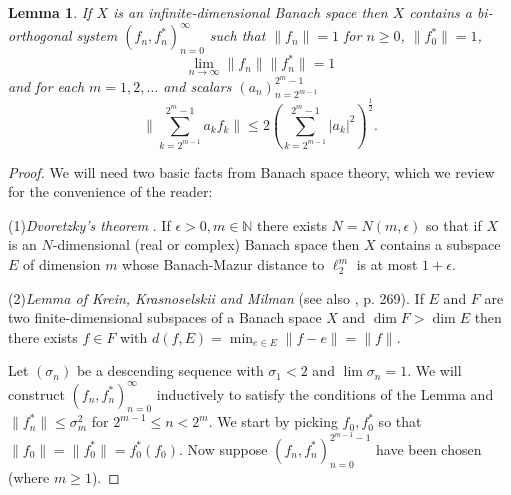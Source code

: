 \documentclass[12pt]{amsart}
\newtheorem{lemma}[thm]{Lemma}
\begin{document}
\begin{lemma}\label{arbitrary}  If $X$ is an infinite-dimensional
Banach space then $X$ contains a bi-orthogonal system
$(f_n,f_n^*)_{n=0}^{\infty}$ such that $\|f_n\|=1$ for $n\ge 0$,
$\|f_0^*\|=1$,
$$ \lim_{n\to\infty}\|f_n\|\|f_n^*\|=1$$ and for each
$m=1,2,\ldots$ and scalars $(a_n)_{n=2^{m-1}}^{2^m-1}$
$$\|\sum_{k=2^{m-1}}^{2^m-1}a_kf_k\|\le
2\left(\sum_{k=2^{m-1}}^{2^m-1}|a_k|^2\right)^{\frac12}.$$
\end{lemma}

\begin{proof}
We will need two basic facts from Banach space theory, which we
review for the convenience of the reader:

(1){\it Dvoretzky's theorem } \cite{MS}.  If $\epsilon>0,
m\in\mathbb N$ there exists $N=N(m,\epsilon)$ so that if $X$ is an
$N$-dimensional (real or complex) Banach space then $X$ contains a
subspace $E$ of dimension $m$ whose Banach-Mazur distance to
$\ell_2^m$ is at most $1+\epsilon.$

(2){\it Lemma of Krein, Krasnoselskii and Milman} \cite{KKR} (see
also \cite{S}, p. 269).  If $E$ and $F$ are two finite-dimensional
subspaces of a Banach space $X$ and $\dim F>\dim E$ then there
exists $f\in F$ with $d(f,E)=\min_{e\in E}\|f-e\|=\|f\|.$



 Let $(\sigma_n)$ be a descending sequence with $\sigma_1<2$ and $\lim
\sigma_n=1.$ We will construct $(f_n,f_n^*)_{n=0}^{\infty}$
inductively to satisfy the conditions of the Lemma and
$\|f_n^*\|\le \sigma_m^2$ for $2^{m-1}\le n<2^m.$  We start by
picking $f_0,f_0^*$ so that $\|f_0\|=\|f_0^*\|=f_0^*(f_0).$  Now
suppose $(f_n,f_n^*)_{n=0}^{2^{m-1}-1}$ have been chosen (where
$m\ge 1$).




\end{proof}
\end{document}
